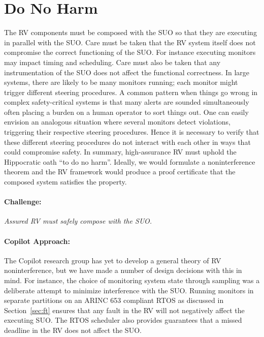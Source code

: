 \section{Do No Harm} \label{sec:noninter} The RV components must be
composed with the SUO so that they are executing in parallel with the
SUO.  Care must be taken that the RV system itself does not compromise
the correct functioning of the SUO.  For instance executing monitors
may impact timing and scheduling. Care must also be taken that any
instrumentation of the SUO does not affect the functional
correctness. In large systems, there are likely to be many monitors
running; each monitor might trigger different steering procedures. A common
pattern when things go wrong in complex safety-critical systems is
that many alerts are sounded simultaneously often placing a burden on
a human operator to sort things out.  One can easily envision an
analogous situation where several monitors detect violations,
triggering their respective steering procedures. Hence it is necessary
to verify that these different steering procedures do not interact with
each other in ways that could compromise safety. In summary,
high-assurance RV must uphold the Hippocratic oath ``to do no harm''.
Ideally, we would formulate a noninterference theorem and the RV
framework would produce a proof certificate that the composed system
satisfies the property.


\paragraph{Challenge:} \emph{Assured RV must safely compose with the
  SUO.}

\paragraph{Copilot Approach:}  
The Copilot research group has yet to develop a general theory of RV 
noninterference, but we have made a number of design decisions with
this in mind. For instance, the choice of monitoring system state
through sampling was a deliberate attempt to minimize interference
with the SUO. Running monitors in separate partitions on an ARINC 653
compliant RTOS as discussed in Section~\ref{sec:ft} ensures that any fault
in the RV will not negatively affect the executing SUO. The RTOS
scheduler also provides guarantees that a missed deadline in the RV
does not affect the SUO.

 

